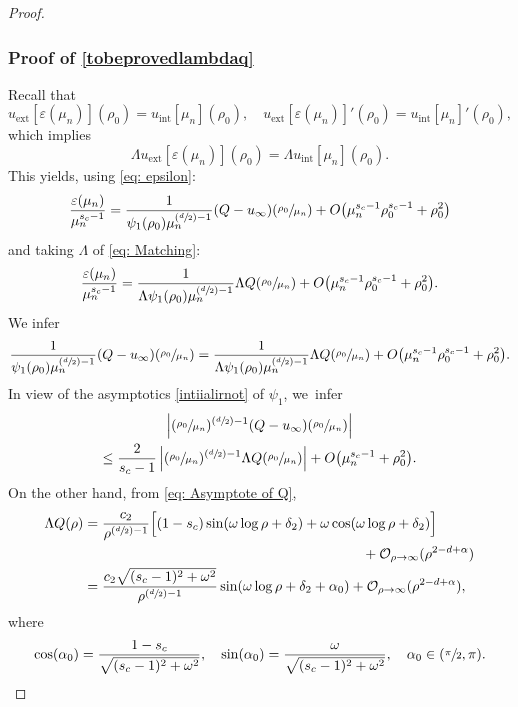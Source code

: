\documentclass[JEP,XML,SOM,Unicode]{cedram}
\newcommand{\Psfrac}[2]{(\sfrac{#1}{#2})}
\theoremstyle{plain}
\theoremstyle{definition}
\DeclareMathOperator{\exterior}{ext}
\DeclareMathOperator{\interior}{int}
\begin{document}
\begin{proof}
\subsubsection*{Proof of \eqref{tobeprovedlambdaq}}
Recall that
\[
u_{\exterior}[\varepsilon(\mu_n)](\rho_0) = u_{\interior}[\mu_n](\rho_0),\quad u_{\exterior}[\varepsilon(\mu_n)]'(\rho_0) = u_{\interior}[\mu_n]'(\rho_0),
\]
which implies
\[
\Lambda u_{\exterior}[\varepsilon(\mu_n)](\rho_0) = \Lambda u_{\interior}[\mu_n](\rho_0).
\]
This yields, using \eqref{eq: epsilon}:
\[
\frac{\varepsilon(\mu_n)}{\mu_n^{s_c-1}} = \frac{1}{\psi_1(\rho_0)\mu_n^{\Psfrac{d}{2}-1}}(Q-u_\infty)(\sfrac{\rho_0}{\mu_n}) + O\big(\mu_n^{s_c-1}\rho_0^{s_c-1}+\rho_0^2\big)
\]
and taking $\Lambda$ of \eqref{eq: Matching}:
\[
\frac{\varepsilon(\mu_n)}{\mu_n^{s_c-1}} = \frac{1}{\Lambda\psi_1(\rho_0)\mu_n^{\Psfrac{d}{2}-1}}\Lambda Q(\sfrac{\rho_0}{\mu_n}) + O\big(\mu_n^{s_c-1} \rho_0^{s_c-1}+\rho_0^2\big).
\]
We infer
\[
\frac{1}{\psi_1(\rho_0)\mu_n^{\Psfrac{d}{2}-1}}(Q-u_\infty)(\sfrac{\rho_0}{\mu_n}) = \frac{1}{\Lambda\psi_1(\rho_0)\mu_n^{\Psfrac{d}{2}-1}}\Lambda Q(\sfrac{\rho_0}{\mu_n})+ O\big(\mu_n^{s_c-1} \rho_0^{s_c-1}+\rho_0^2\big).
\]
In view of the asymptotics \eqref{intiialirnot} of $\psi_1$, we~infer
\begin{multline}
\label{eq:usefulboundtocountnumberofzeros}
\left|(\sfrac{\rho_0}{\mu_n})^{\Psfrac{d}{2}-1}(Q-u_\infty)(\sfrac{\rho_0}{\mu_n})\right|\\
\leq \frac{2}{s_c-1}\left|(\sfrac{\rho_0}{\mu_n})^{\Psfrac{d}{2}-1}\Lambda Q(\sfrac{\rho_0}{\mu_n})\right|+ O\big(\mu_n^{s_c-1}+\rho_0^2\big).
\end{multline}
On the other hand, from \eqref{eq: Asymptote of Q},
\begin{equation}
\label{eq:equationwithtwostars}
\begin{aligned}
\Lambda Q(\rho)&=\frac{c_2}{ \rho^{\Psfrac{d}{2}-1}}\Big[(1-s_c)\sin(\omega\log\rho+\delta_2)+\omega\cos (\omega\log\rho+\delta_2)\Big]\\
&\hspace*{7cm}+\mathcal O_{\rho\to\infty}(\rho^{2-d+\alpha})\\
&=\frac{c_2\sqrt{(s_c-1)^2+\omega^2}}{ \rho^{\Psfrac{d}{2}-1}}\sin(\omega\log\rho+\delta_2+\alpha_0)+\mathcal O_{\rho\to\infty}(\rho^{2-d+\alpha}),
\end{aligned}
\end{equation}
where
\[
\cos(\alpha_0)=\frac{1-s_c}{\sqrt{(s_c-1)^2+\omega^2}},\quad \sin(\alpha_0)=\frac{\omega}{\sqrt{(s_c-1)^2+\omega^2}},\quad\alpha_0\in(\sfrac{\pi}{2}, \pi).
\]
\end{proof}
\end{document}

